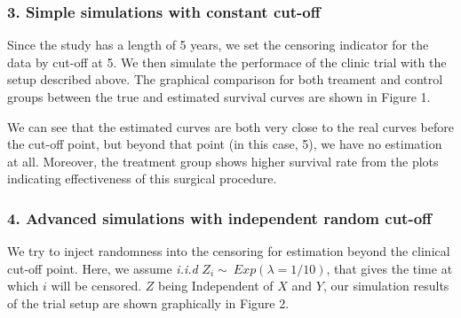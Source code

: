 \documentclass{article}
\begin{document}
\subsubsection*{3. Simple simulations with constant cut-off}
\hspace{12 pt} Since the study has a length of 5 years, we set the
censoring indicator for the data by cut-off at 5. We then
simulate the performace of the clinic trial with the setup described
above. The graphical comparison for both treament and control groups
between the true and estimated survival curves are shown in Figure 1.


We can see that the estimated curves are both very close to the real curves
before the cut-off point, but beyond that point (in this case, 5), we
have no estimation at all. Moreover, the treatment group shows higher
survival rate from the plots indicating effectiveness of this surgical procedure.



\subsubsection*{4. Advanced simulations with independent random cut-off}
\hspace{12 pt} We try to inject randomness into the censoring for
estimation beyond the clinical cut-off point. Here, we assume
\textit{i.i.d} $Z_i \sim ~ Exp(\lambda = 1/10)$, that gives the time
at which $i$ will be censored. $Z$ being Independent of $X$ and $Y$, our
simulation results of the trial setup are shown graphically in Figure 2.
\end{document}
